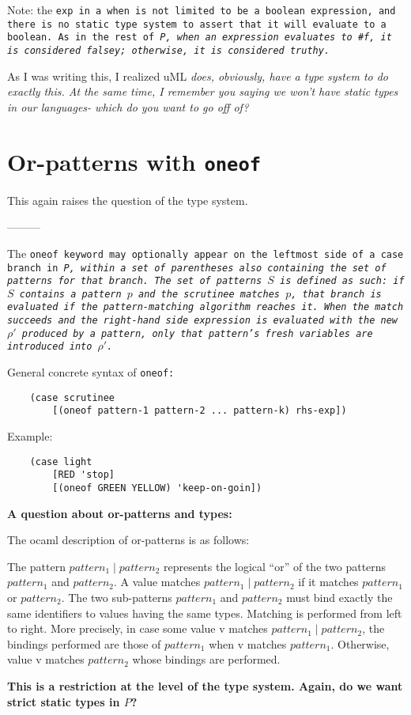 \documentclass[]{article}
\begin{document}
Note: the \tt{exp} in a \tt{when} is not limited to be a boolean expression, 
and there is no static type system to assert that it will evaluate to a boolean.
As in the rest of \it{P}, when an expression evaluates to \tt{\#f}, it
is considered falsey; otherwise, it is considered truthy. 

\medskip

As I was writing this, I realized uML \it{does}, obviously, have a type system
to do exactly this. At the same time, I remember you saying we won't have static
types in our languages- which do you want to go off of? 

\section{Or-patterns with \tt{oneof}}

\medskip

This again raises the question of the type system. 

---------


The \tt{oneof} keyword may optionally appear on the leftmost side of a \tt{case}
branch in \it{P}, within a set of parentheses also containing the set of 
patterns for that branch. The set of patterns $S$ is defined as such: if $S$ 
contains a pattern $p$ and the scrutinee matches $p$, that branch is evaluated
if the pattern-matching algorithm reaches it. 
When the match succeeds and the right-hand
side expression is evaluated with the new $\rho'$ produced by a pattern, only 
that pattern's fresh variables are introduced into $\rho'$. 

\medskip

General concrete syntax of \tt{oneof}: 


\begin{verbatim}
    (case scrutinee
        [(oneof pattern-1 pattern-2 ... pattern-k) rhs-exp])
\end{verbatim}


Example: 
\begin{verbatim}
    (case light
        [RED 'stop]
        [(oneof GREEN YELLOW) 'keep-on-goin])
\end{verbatim}



\medskip

\bf{A question about or-patterns and types: }


The ocaml description of or-patterns is as follows: 

\medskip

The pattern $pattern_1 \mid pattern_2$ represents the logical “or” of the two
patterns $pattern_1$ and $pattern_2$. A value matches $pattern_1 \mid pattern_2$
if it matches $pattern_1$ or $pattern_2$. The two sub-patterns $pattern_1$ and
$pattern_2$ must bind exactly the same identifiers to values having the same
types. Matching is performed from left to right. More precisely, in case some
value v matches $pattern_1 \mid pattern_2$, the bindings performed are those of
$pattern_1$ when v matches $pattern_1$. Otherwise, value v matches $pattern_2$
whose bindings are performed.

\medskip

\bf{This is a restriction at the level of the type system.
Again, do we want strict static types in $P$?}
\end{document}
